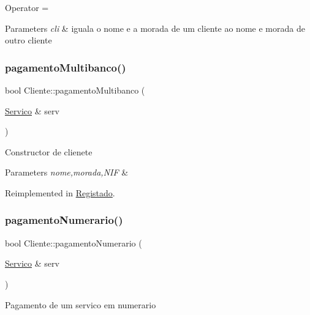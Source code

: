 Operator =


\begin{DoxyParams}{Parameters}
{\em cli} & iguala o nome e a morada de um cliente ao nome e morada de outro cliente \\
\hline
\end{DoxyParams}
\hypertarget{class_cliente_a6e230e5e512bebe07bfa1ad6750b8cee}{}\label{class_cliente_a6e230e5e512bebe07bfa1ad6750b8cee} 
\subsubsection{\texorpdfstring{pagamento\+Multibanco()}{pagamentoMultibanco()}}
{\footnotesize\ttfamily bool Cliente\+::pagamento\+Multibanco (\begin{DoxyParamCaption}\item[{\hyperlink{class_servico}{Servico} \&}]{serv }\end{DoxyParamCaption})\hspace{0.3cm}{\ttfamily [virtual]}}

Constructor de clienete 
\begin{DoxyParams}{Parameters}
{\em nome,morada,N\+IF} & \\
\hline
\end{DoxyParams}


Reimplemented in \hyperlink{class_registado_a36be4ccf8e4b1bc26be7c1c2d4612229}{Registado}.

\hypertarget{class_cliente_a68646846a80de5cdcb61b1f8a13e4fb8}{}\label{class_cliente_a68646846a80de5cdcb61b1f8a13e4fb8} 
\subsubsection{\texorpdfstring{pagamento\+Numerario()}{pagamentoNumerario()}}
{\footnotesize\ttfamily bool Cliente\+::pagamento\+Numerario (\begin{DoxyParamCaption}\item[{\hyperlink{class_servico}{Servico} \&}]{serv }\end{DoxyParamCaption})\hspace{0.3cm}{\ttfamily [virtual]}}

Pagamento de um servico em numerario


